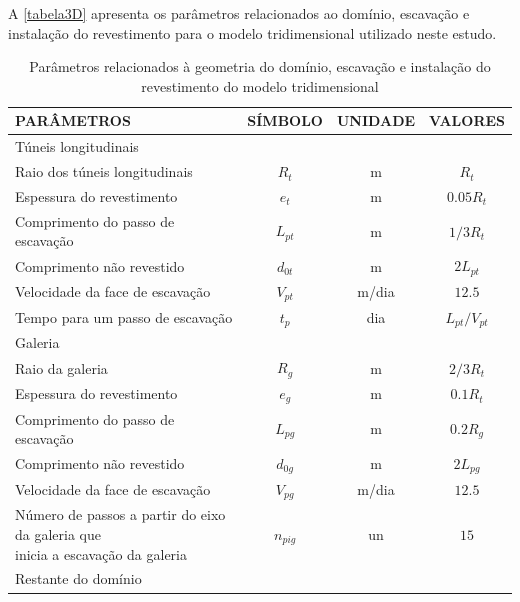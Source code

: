 A \autoref{tabela3D} apresenta os parâmetros relacionados ao domínio, escavação e instalação do revestimento para o modelo tridimensional utilizado neste estudo.





\begin{table}[H]
	\caption{Parâmetros relacionados à geometria do domínio, escavação e instalação do revestimento do modelo tridimensional}
	\label{tabela3D}
	\centering
	\small
	\renewcommand{\arraystretch}{1.5}
	\begin{tabular}{l c c c}
		\hline
		\multicolumn{1}{l}{PARÂMETROS} &
		\multicolumn{1}{c}{SÍMBOLO} &
		\multicolumn{1}{c}{UNIDADE} &
		\multicolumn{1}{c}{VALORES} \\
		\hline
		\multicolumn{4}{l}{Túneis longitudinais} \\
		\hline
		Raio dos túneis longitudinais & $R_t$ & m & $R_t$ \\
		Espessura do revestimento & $e_t$ & m & $0.05R_t$ \\
		Comprimento do passo de escavação & $L_{pt}$ & m & $1/3R_t$ \\
		Comprimento não revestido & $d_{0t}$ & m & $2L_{pt}$ \\
		Velocidade da face de escavação & $V_{pt}$ & m/dia & $12.5$ \\
		Tempo para um passo de escavação & $t_p$ & dia & $L_{pt}/V_{pt}$ \\
		\hline
		\multicolumn{4}{l}{Galeria} \\
		\hline
		Raio da galeria & $R_{g}$ & m & $2/3R_t$ \\
		Espessura do revestimento & $e_g$ & m & $0.1R_t$ \\
		Comprimento do passo de escavação & $L_{pg}$ & m & $0.2R_g$ \\
		Comprimento não revestido & $d_{0g}$ & m & $2L_{pg}$ \\
		Velocidade da face de escavação & $V_{pg}$ & m/dia & $12.5$ \\
		\makecell[l]{Número de passos a partir do eixo da galeria que \\ inicia a escavação da galeria}  & $n_{pig}$ & un & $15$ \\
		\hline
		\multicolumn{4}{l}{Restante do domínio} \\

\end{tabular}
\end{table}
